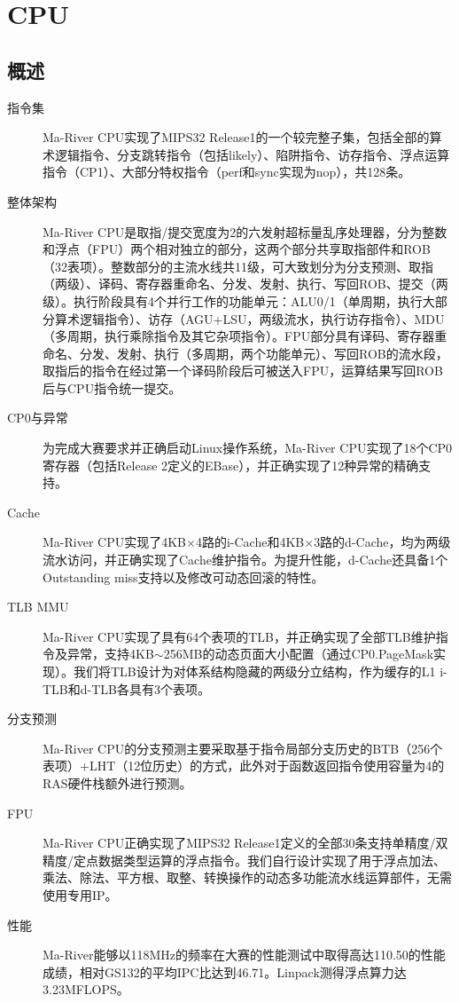\chapter{CPU}

\section{概述}

\begin{description}

\item[指令集] \quad Ma-River CPU实现了MIPS32 Release1的一个较完整子集，包括全部的算术逻辑指令、分支跳转指令（包括likely）、陷阱指令、访存指令、浮点运算指令（CP1）、大部分特权指令（perf和sync实现为nop），共128条。

\item[整体架构] \quad Ma-River CPU是取指/提交宽度为2的六发射超标量乱序处理器，分为整数和浮点（FPU）两个相对独立的部分，这两个部分共享取指部件和ROB（32表项）。整数部分的主流水线共11级，可大致划分为分支预测、取指（两级）、译码、寄存器重命名、分发、发射、执行、写回ROB、提交（两级）。执行阶段具有4个并行工作的功能单元：ALU0/1（单周期，执行大部分算术逻辑指令）、访存（AGU+LSU，两级流水，执行访存指令）、MDU（多周期，执行乘除指令及其它杂项指令）。FPU部分具有译码、寄存器重命名、分发、发射、执行（多周期，两个功能单元）、写回ROB的流水段，取指后的指令在经过第一个译码阶段后可被送入FPU，运算结果写回ROB后与CPU指令统一提交。

\item[CP0与异常] \quad 为完成大赛要求并正确启动Linux操作系统，Ma-River CPU实现了18个CP0寄存器（包括Release 2定义的EBase），并正确实现了12种异常的精确支持。

\item[Cache] \quad Ma-River CPU实现了4KB$\times$4路的i-Cache和4KB$\times$3路的d-Cache，均为两级流水访问，并正确实现了Cache维护指令。为提升性能，d-Cache还具备1个Outstanding miss支持以及修改可动态回滚的特性。

\item[TLB MMU] \quad Ma-River CPU实现了具有64个表项的TLB，并正确实现了全部TLB维护指令及异常，支持4KB$\sim$256MB的动态页面大小配置（通过CP0.PageMask实现）。我们将TLB设计为对体系结构隐藏的两级分立结构，作为缓存的L1 i-TLB和d-TLB各具有3个表项。

\item[分支预测] \quad Ma-River CPU的分支预测主要采取基于指令局部分支历史的BTB（256个表项）+LHT（12位历史）的方式，此外对于函数返回指令使用容量为4的RAS硬件栈额外进行预测。

\item[FPU] \quad Ma-River CPU正确实现了MIPS32 Release1定义的全部30条支持单精度/双精度/定点数据类型运算的浮点指令。我们自行设计实现了用于浮点加法、乘法、除法、平方根、取整、转换操作的动态多功能流水线运算部件，无需使用专用IP。

\item[性能] \quad Ma-River能够以118MHz的频率在大赛的性能测试中取得高达110.50的性能成绩，相对GS132的平均IPC比达到46.71。Linpack测得浮点算力达3.23MFLOPS。

\end{description}

